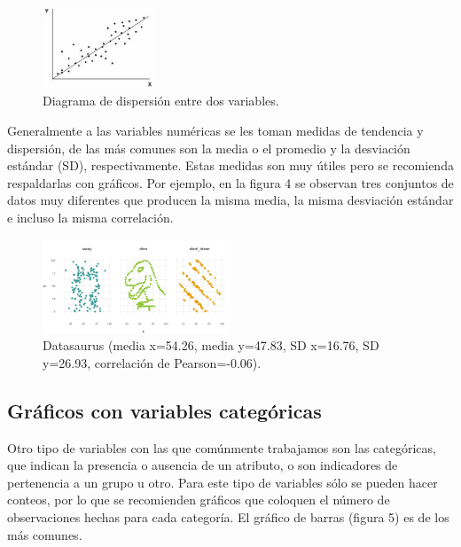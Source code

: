 \documentclass[conference, a4paper]{IEEEtran_ID}
\begin{document}
\begin{figure}[htbp]
	\centerline{\includegraphics[width=0.3\textwidth]{scatterplot.png}}
	\caption{Diagrama de dispersión entre dos variables.}
	\label{fig_sample}
\end{figure}

\bigskip
\bigskip

\newpage

Generalmente a las variables numéricas se les toman medidas de tendencia y dispersión, de las más comunes son la media o el promedio y la desviación estándar (SD), respectivamente. Estas medidas son muy útiles pero se recomienda respaldarlas con gráficos. Por ejemplo, en la figura 4 se observan tres conjuntos de datos muy diferentes que producen la misma media, la misma desviación estándar e incluso la misma correlación. 

\begin{figure}[htbp]
	\centerline{\includegraphics[width=0.5\textwidth]{datasaurus.png}}
	\caption{Datasaurus (media x=54.26, media y=47.83, SD x=16.76, SD y=26.93, correlación de Pearson=-0.06).}
	\label{fig_sample}
\end{figure}


\subsection{Gráficos con variables categóricas}

Otro tipo de variables con las que comúnmente trabajamos son las categóricas, que indican la presencia o ausencia de un atributo, o son indicadores de pertenencia a un grupo u otro. Para este tipo de variables sólo se pueden hacer conteos, por lo que se recomienden gráficos que coloquen el número de observaciones hechas para cada categoría. El gráfico de barras (figura 5) es de los más comunes.
\end{document}
